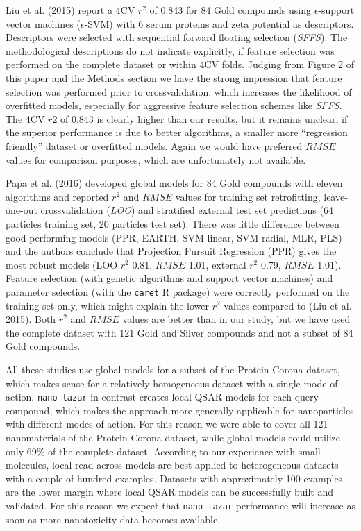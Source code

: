 \documentclass[utf8]{frontiersHLTH} %
\begin{document}
Liu et al. (2015) report a 4CV \(r^2\) of 0.843 for 84 Gold compounds
using \(\epsilon\)-support vector machines (\(\epsilon\)-SVM) with 6
serum proteins and zeta potential as descriptors. Descriptors were
selected with sequential forward floating selection (\emph{SFFS}). The
methodological descriptions do not indicate explicitly, if feature
selection was performed on the complete dataset or within 4CV folds.
Judging from Figure 2 of this paper and the Methods section we have the
strong impression that feature selection was performed prior to
crossvalidation, which increases the likelihood of overfitted models,
especially for aggressive feature selection schemes like \emph{SFFS}.
The 4CV \(r2\) of 0.843 is clearly higher than our results, but it
remains unclear, if the superior performance is due to better
algorithms, a smaller more ``regression friendly'' dataset or overfitted
models. Again we would have preferred \(RMSE\) values for comparison
purposes, which are unfortunately not available.

Papa et al. (2016) developed global models for 84 Gold compounds with
eleven algorithms and reported \(r^2\) and \(RMSE\) values for training
set retrofitting, leave-one-out crossvalidation (\emph{LOO}) and
stratified external test set predictions (64 particles training set, 20
particles test set). There was little difference between good performing
models (PPR, EARTH, SVM-linear, SVM-radial, MLR, PLS) and the authors
conclude that Projection Pursuit Regression (PPR) gives the most robust
models (LOO \(r^2\) 0.81, \(RMSE\) 1.01, external \(r^2\) 0.79, \(RMSE\)
1.01). Feature selection (with genetic algorithms and support vector
machines) and parameter selection (with the \texttt{caret} R package)
were correctly performed on the training set only, which might explain
the lower \(r^2\) values compared to (Liu et al. 2015). Both \(r^2\) and
\(RMSE\) values are better than in our study, but we have used the
complete dataset with 121 Gold and Silver compounds and not a subset of
84 Gold compounds.

All these studies use global models for a subset of the Protein Corona
dataset, which makes sense for a relatively homogeneous dataset with a
single mode of action. \texttt{nano-lazar} in contrast creates local
QSAR models for each query compound, which makes the approach more
generally applicable for nanoparticles with different modes of action.
For this reason we were able to cover all 121 nanomaterials of the
Protein Corona dataset, while global models could utilize only 69\% of
the complete dataset. According to our experience with small molecules,
local read across models are best applied to heterogeneous datasets with
a couple of hundred examples. Datasets with approximately 100 examples
are the lower margin where local QSAR models can be successfully built
and validated. For this reason we expect that \texttt{nano-lazar}
performance will increase as soon as more nanotoxicity data becomes
available.
\end{document}

